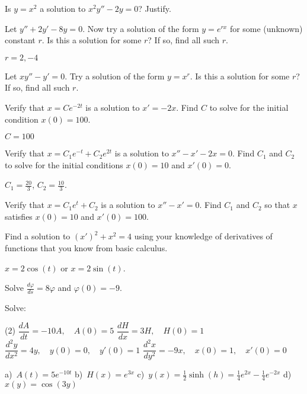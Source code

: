 \begin{exercise}\ansMark%
Is $y = x^2$ a solution to $x^2y'' - 2y = 0$?  Justify.
\end{exercise}

\begin{exercise}
Let $y'' + 2y' - 8y = 0$.  Now try a solution of the form $y = e^{rx}$ for
some (unknown) constant $r$.  Is this a solution
for some $r$?  If so, find all such $r$.
\end{exercise}
\comboSol{%
}
{%
$r = 2, -4$
}

\begin{exercise}\ansMark%
Let $xy'' - y' = 0$.  Try a solution of the form $y = x^r$.  Is this a
solution for some $r$?  If so, find all such $r$.
\end{exercise}

\begin{exercise}
Verify that $x = C e^{-2t}$ is a solution to $x' = -2x$.
Find $C$ to solve for the initial condition $x(0) = 100$.
\end{exercise}
\comboSol{%
}
{%
$C = 100$
}

\begin{exercise}
Verify that $x = C_1 e^{-t} + C_2 e^{2t}$ is a solution to $x'' - x' -2 x =
0$.  Find $C_1$ and $C_2$ to solve for the initial conditions $x(0) = 10$
and $x'(0) = 0$.
\end{exercise}
\comboSol{%
}
{%
$C_1 = \frac{20}{3}$, $C_2 = \frac{10}{3}$.
}

\begin{exercise}\ansMark%
Verify that $x=C_1e^t+C_2$ is a solution to $x''-x' = 0$.  Find $C_1$ and
$C_2$ so that $x$ satisfies $x(0) = 10$ and $x'(0) = 100$.
\end{exercise}

\begin{exercise}
Find a solution to
${(x')}^2 + x^2 = 4$
using your knowledge of derivatives of functions that you
know from basic calculus.
\end{exercise}
\comboSol{%
}
{%
$x = 2\cos(t)$ or $x = 2\sin(t)$.
}

\begin{exercise}\ansMark%
Solve $\frac{d\varphi}{ds} = 8 \varphi$ and $\varphi(0) = -9$.
\end{exercise}

\begin{exercise}
Solve:
\begin{tasks}(2)
\task $\dfrac{dA}{dt} = -10 A, \quad A(0)=5$
\task $\dfrac{dH}{dx} = 3 H, \quad H(0)=1$
\task $\dfrac{d^2y}{dx^2} = 4 y, \quad y(0)=0, \quad y'(0)=1$
\task $\dfrac{d^2x}{dy^2} = -9 x, \quad x(0)=1, \quad x'(0)=0$
\end{tasks}
\end{exercise}
\comboSol{%
}
{%
a)~$A(t) = 5e^{-10t}$\quad
b)~$H(x) = e^{3x}$\quad
c)~$y(x) = \frac{1}{2}\sinh(h) = \frac{1}{4}e^{2x} - \frac{1}{4}e^{-2x}$\quad
d)~$x(y) = \cos(3y)$
}

